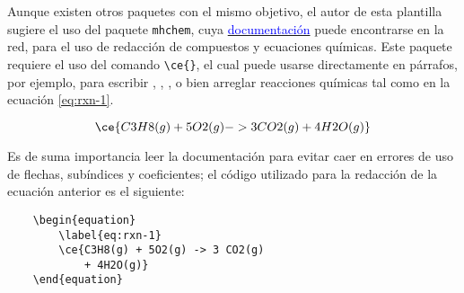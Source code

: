 Aunque existen otros paquetes con el mismo objetivo, el autor de esta plantilla sugiere el uso del paquete \texttt{mhchem}, cuya \href{https://mirrors.rit.edu/CTAN/macros/latex/contrib/mhchem/mhchem.pdf}{\textcolor{blue}{documentación}} puede encontrarse en la red, para el uso de redacción de compuestos y ecuaciones químicas. Este paquete requiere el uso del comando \verb|\ce{}|, el cual puede usarse directamente en párrafos, por ejemplo, para escribir , , , o bien arreglar reacciones químicas tal como en la ecuación \eqref{eq:rxn-1}.

\begin{equation}
    \label{eq:rxn-1}
    \ce{C3H8(g) + 5 O2(g) -> 3 CO2(g) + 4 H2O(g)}
\end{equation}

\noindent Es de suma importancia leer la documentación para evitar caer en errores de uso de flechas, subíndices y coeficientes; el código utilizado para la redacción de la ecuación anterior es el siguiente:

\begin{verbatim}
    \begin{equation}
        \label{eq:rxn-1}
        \ce{C3H8(g) + 5O2(g) -> 3 CO2(g) 
            + 4H2O(g)}
    \end{equation}
\end{verbatim}